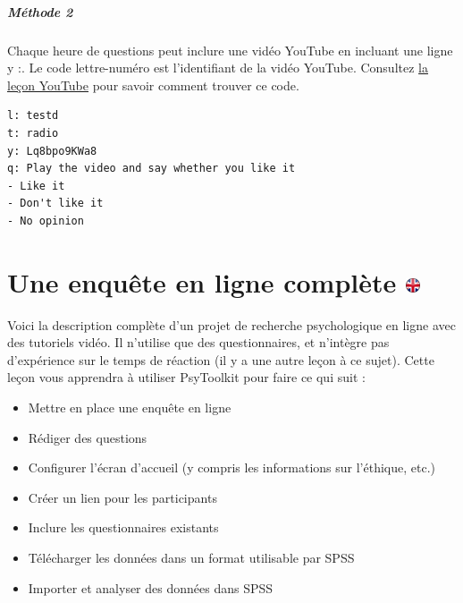 \documentclass[
]{book}
\providecommand{\tightlist}{%
  \setlength{\itemsep}{0pt}\setlength{\parskip}{0pt}}
\begin{document}
\hypertarget{muxe9thode-2}{%
\paragraph{Méthode 2}\label{muxe9thode-2}}

Chaque heure de questions peut inclure une vidéo YouTube en incluant une
ligne y :. Le code lettre-numéro est l'identifiant de la vidéo YouTube.
Consultez
\href{https://www.psytoolkit.org/lessons/youtube_video.html}{la leçon
YouTube} pour savoir comment trouver ce code.

\begin{verbatim}
l: testd
t: radio
y: Lq8bpo9KWa8
q: Play the video and say whether you like it
- Like it
- Don't like it
- No opinion
\end{verbatim}

\hypertarget{une-enquuxeate-en-ligne-compluxe8te}{%
\chapter[Une enquête en ligne complète ]{\texorpdfstring{Une enquête en
ligne complète
\href{https://www.psytoolkit.org/lessons/questionnaire-project.html}{\protect\includegraphics{img/ukflag.png}}}{Une enquête en ligne complète }}\label{une-enquuxeate-en-ligne-compluxe8te}}

Voici la description complète d'un projet de recherche psychologique en
ligne avec des tutoriels vidéo. Il n'utilise que des questionnaires, et
n'intègre pas d'expérience sur le temps de réaction (il y a une autre
leçon à ce sujet). Cette leçon vous apprendra à utiliser PsyToolkit pour
faire ce qui suit :

\begin{itemize}
\tightlist
\item
  Mettre en place une enquête en ligne
\item
  Rédiger des questions
\item
  Configurer l'écran d'accueil (y compris les informations sur
  l'éthique, etc.)
\item
  Créer un lien pour les participants
\item
  Inclure les questionnaires existants
\item
  Télécharger les données dans un format utilisable par SPSS
\item
  Importer et analyser des données dans SPSS
\end{itemize}
\end{document}
